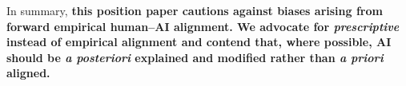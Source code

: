 \documentclass{article}
\theoremstyle{plain}
\theoremstyle{definition}
\theoremstyle{remark}
\begin{document}





















In summary, \textbf{this position paper cautions against biases arising from forward empirical human--AI alignment. We advocate for \textit{prescriptive} instead of empirical alignment and contend that, where possible, AI should be \textit{a posteriori} explained and modified rather than \textit{a priori} aligned.  
}





\end{document}
